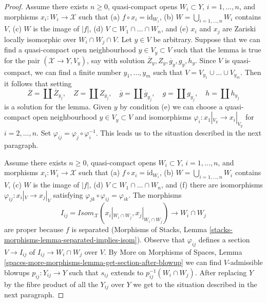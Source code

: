 \documentclass{stacks-project}
\theoremstyle{plain}
\theoremstyle{definition}
\theoremstyle{remark}
\numberwithin{equation}{subsection}
\begin{document}
\begin{proof}
\medskip\noindent
Assume there exists $n \geq 0$, quasi-compact opens
$W_i \subset Y$, $i = 1, \ldots, n$, and
morphisms $x_i : W_i \to \mathcal{X}$ such that
(a) $f \circ x_i = \text{id}_{W_i}$,
(b) $W = \bigcup_{i = 1, \ldots, n} W_i$ contains $V$,
(c) $W$ is the image of $|f|$,
(d) $V \subset W_1 \cap \ldots \cap W_n$, and
(e) $x_i$ and $x_j$ are Zariski locally isomorphic over $W_i \cap W_j \cap V$.
Let $y \in V$ be arbitrary.
Suppose that we can find a quasi-compact open neighbourhood
$y \in V_y \subset V$ such that the lemma is true for
the pair $(\mathcal{X} \to Y, V_y)$, say with solution
$\overline{Z}_y, Z_y, \overline{g}_y, g_y, h_y$.
Since $V$ is quasi-compact, we can find a finite number
$y_1, \ldots, y_m$ such that $V = V_{y_1} \cup \ldots \cup V_{y_m}$.
Then it follows that setting
$$
\overline{Z} = \coprod \overline{Z}_{y_j},\quad
Z = \coprod Z_{y_j},\quad
\overline{g} = \coprod \overline{g}_{y_j},\quad
g = \coprod g_{y_j},\quad
h = \coprod h_{y_j}
$$
is a solution for the lemma. Given $y$ by condition (e)
we can choose a quasi-compact open neighbourhood $y \in V_y \subset V$
and isomorphisms $\varphi_i : x_1|_{V_y} \to x_i|_{V_y}$ for
$i = 2, \ldots, n$. Set $\varphi_{ij} = \varphi_j \circ \varphi_i^{-1}$.
This leads us to the situation described in the next paragraph.

\medskip\noindent
Assume there exists $n \geq 0$, quasi-compact opens
$W_i \subset Y$, $i = 1, \ldots, n$, and
morphisms $x_i : W_i \to \mathcal{X}$ such that
(a) $f \circ x_i = \text{id}_{W_i}$,
(b) $W = \bigcup_{i = 1, \ldots, n} W_i$ contains $V$,
(c) $W$ is the image of $|f|$,
(d) $V \subset W_1 \cap \ldots \cap W_n$, and
(f) there are isomorphisms $\varphi_{ij} : x_i|_V \to x_j|_V$
satisfying $\varphi_{jk} \circ \varphi_{ij} = \varphi_{ik}$.
The morphisms
$$
I_{ij} = \mathit{Isom}_\mathcal{X}(x_i|_{W_i \cap W_j},
x_j|_{W_i \cap W_j}) \longrightarrow W_i \cap W_j
$$
are proper because $f$ is separated
(Morphisms of Stacks, Lemma
\ref{stacks-morphisms-lemma-separated-implies-isom}).
Observe that $\varphi_{ij}$ defines a section $V \to I_{ij}$
of $I_{ij} \to W_i \cap W_j$ over $V$.
By More on Morphisms of Spaces, Lemma
\ref{spaces-more-morphisms-lemma-get-section-after-blowup}
we can find $V$-admissible blowups
$p_{ij} : Y_{ij} \to Y$ such that $s_{ij}$
extends to $p_{ij}^{-1}(W_i \cap W_j)$.
After replacing $Y$ by the fibre product of all the $Y_{ij}$
over $Y$ we get to the situation described in the next paragraph.


\end{proof}
\end{document}
